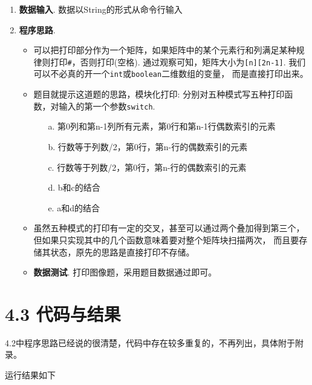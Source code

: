 \begin{enumerate}
    \item \textbf{数据输入}. 数据以String的形式从命令行输入
    \item \textbf{程序思路}.
    \begin{itemize}
        \item 可以把打印部分作为一个矩阵，如果矩阵中的某个元素行和列满足某种规律则打印\lstinline{#}，否则打印\text{ }(空格).
            通过观察可知，矩阵大小为\lstinline{[n][2n-1]}. 我们可以不必真的开一个\lstinline{int}或\lstinline{boolean}二维数组的变量，
            而是直接打印出来。
        \item 题目就提示这道题的思路，模块化打印: 分别对五种模式写五种打印函数，对输入的第一个参数\lstinline{switch}. 
            \begin{itemize}
                \item[a.] 第0列和第n-1列所有元素，第0行和第n-1行偶数索引的元素
                \item[b.] 行数等于列数/2，第0行，第n-行的偶数索引的元素
                \item[c.] 行数等于列数/2，第0行，第n-行的偶数索引的元素
                \item[d.] b和c的结合
                \item[e.] a和d的结合
            \end{itemize}
        \item 虽然五种模式的打印有一定的交叉，甚至可以通过两个叠加得到第三个，但如果只实现其中的几个函数意味着要对整个矩阵块扫描两次，
            而且要存储其状态，原先的思路是直接打印不存储。
    \item \textbf{数据测试}. 打印图像题，采用题目数据通过即可。
    \end{itemize}
\end{enumerate}

\section{4.3 代码与结果}

4.2中程序思路已经说的很清楚，代码中存在较多重复的，不再列出，具体附于附录。

运行结果如下

